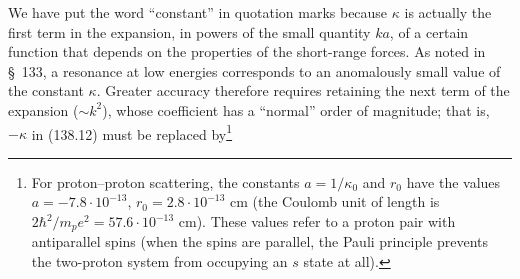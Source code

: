 We have put the word ``constant'' in quotation marks because $\kappa$ is actually the first term in the expansion, in powers of the small quantity $ka$, of a certain function that depends on the properties of the short-range forces. As noted in \S~133, a resonance at low energies corresponds to an anomalously small value of the constant $\kappa$. Greater accuracy therefore requires retaining the next term of the expansion ($\sim k^2$), whose coefficient has a ``normal'' order of magnitude; that is, $-\kappa$ in (138.12) must be replaced by\footnote{For proton--proton scattering, the constants $a=1/\kappa_0$ and $r_0$ have the values $a=-7.8\cdot10^{-13}$, $r_0=2.8\cdot10^{-13}$ cm (the Coulomb unit of length is $2\hbar^2/m_pe^2=57.6\cdot10^{-13}$ cm). These values refer to a proton pair with antiparallel spins (when the spins are parallel, the Pauli principle prevents the two-proton system from occupying an $s$ state at all).}
